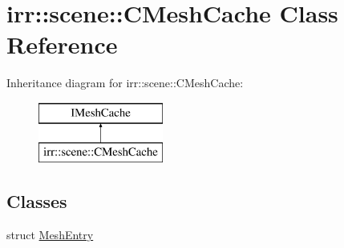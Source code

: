 \hypertarget{classirr_1_1scene_1_1_c_mesh_cache}{\section{irr\-:\-:scene\-:\-:C\-Mesh\-Cache Class Reference}
\label{classirr_1_1scene_1_1_c_mesh_cache}
}
Inheritance diagram for irr\-:\-:scene\-:\-:C\-Mesh\-Cache\-:\begin{figure}[H]
\begin{center}
\leavevmode
\includegraphics[height=2.000000cm]{classirr_1_1scene_1_1_c_mesh_cache}
\end{center}
\end{figure}
\subsection*{Classes}
\begin{DoxyCompactItemize}
\item 
struct \hyperlink{structirr_1_1scene_1_1_c_mesh_cache_1_1_mesh_entry}{Mesh\-Entry}
\end{DoxyCompactItemize}
